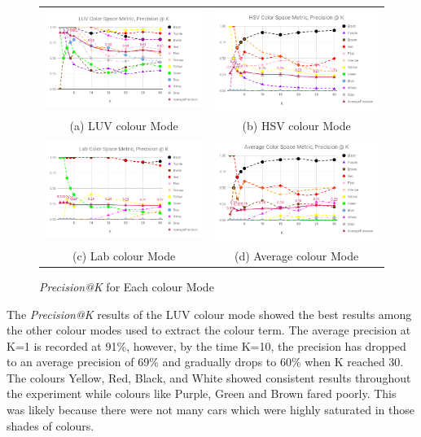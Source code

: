\begin{figure}[htb!]
  \centering
\begin{tabular}{cc}
 \includegraphics[width=0.5\linewidth]{image/new/luv@k.png} &
 \includegraphics[width=0.5\linewidth]{image/new/hsv@k.png}\\
 (a) LUV colour Mode &
 (b) HSV colour Mode \\
 \includegraphics[width=0.5\linewidth]{image/new/lab@k.png} &
 \includegraphics[width=0.5\linewidth]{image/new/avg@k.png} \\
 (c) Lab colour Mode&
 (d) Average colour Mode \\
\end{tabular}
\caption{\textit{Precision@K} for Each colour Mode} \label{fig:colorspace_score}
\end{figure}

The \textit{Precision@K} results of the LUV colour mode showed the best results
among the other colour modes used to extract the colour term. The average
precision at K=1 is recorded at 91\%, however, by the time K=10, the precision
has dropped to an average precision of 69\% and gradually drops to 60\% when K
reached 30. The colours Yellow, Red, Black, and White showed consistent results
throughout the experiment while colours like Purple, Green and Brown fared
poorly. This was likely because there were not many cars which were highly
saturated in those shades of colours.

